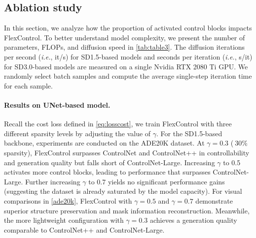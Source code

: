 \subsection{Ablation study}

In this section, we analyze how the proportion of activated control blocks impacts FlexControl. To better understand model complexity, we present the number of parameters, FLOPs, and diffusion speed in \cref{tab:table3}. The diffusion iterations per second (\textit{i.e.}, it/s) for SD1.5-based models and seconds per iteration (\textit{i.e.}, s/it) for SD3.0-based models are measured on a single Nvidia RTX 2080 Ti GPU. We randomly select batch samples and compute the average single-step iteration time for each sample. 

\paragraph{Results on UNet-based model.}
Recall the cost loss defined in \cref{eq:losscost}, we train FlexControl with three different sparsity levels by adjusting the value of $\gamma$.  For the SD1.5-based backbone, experiments are conducted on the ADE20K dataset. At $\gamma=0.3$ ($~$30\% sparsity), FlexControl surpasses ControlNet and ControlNet++ in controllability and generation quality but falls short of ControlNet-Large. Increasing $\gamma$ to 0.5 activates more control blocks, leading to performance that surpasses ControlNet-Large. Further increasing $\gamma$ to 0.7 yields no significant performance gains (suggesting the dataset is already saturated by the model capacity).  For visual comparisons in \cref{ade20k}, FlexControl with $\gamma=0.5$ and $\gamma=0.7$ demonstrate superior structure preservation and mask information reconstruction. Meanwhile, the more lightweight configuration with $\gamma=0.3$ achieves a generation quality comparable to ControlNet++ and ControlNet-Large.

